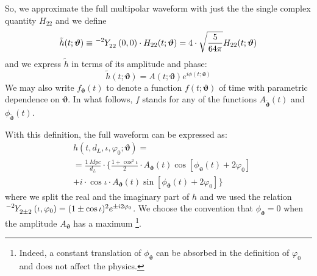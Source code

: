 So, we approximate the full multipolar waveform with just the  the single complex quantity $H_{22}$ and we define
\begin{equation}\label{eq:h_std}
	\tilde{h}(t; \boldsymbol{\vartheta}) \equiv \tensor[^{-2}]{Y}{_{2 2}}(0,0) \cdot H_{22}(t; \boldsymbol{\vartheta}) = 4\cdot\sqrt{\frac{5}{64\pi}}H_{22}(t; \boldsymbol{\vartheta})
\end{equation}
and we express $\tilde{h}$ in terms of its amplitude and phase:
\begin{equation}\label{eq:h_ML}
	\tilde{h}(t; \boldsymbol{\vartheta}) = A(t; \boldsymbol{\vartheta}) e^{i \phi(t; \boldsymbol{\vartheta})} 
\end{equation}
We may also write $f_{\boldsymbol{\vartheta}}(t)$ to denote a function $f(t;\boldsymbol{\vartheta})$ of time with parametric dependence on $\boldsymbol{\vartheta}$.
In what follows, $f$ stands for any of the functions $A_{\tilde{\boldsymbol{\vartheta}}}(t)$ and ${\phi}_{\tilde{\boldsymbol{\vartheta}}}(t)$.
\par
With this definition, the full waveform can be expressed as:
\begin{align} 
	&h(t, d_L,\iota,\varphi_0; \boldsymbol{\vartheta}) =  \nonumber\\
		&= {\frac{\SI{1}{Mpc}}{d_L}} \cdot \Bigg\{ \frac{1+\cos^2\iota}{2} \cdot A_{\boldsymbol{\vartheta}}(t)  \cos[\phi_{\boldsymbol{\vartheta}}(t)+2\varphi_0]  \nonumber \\
		&+ i \cdot \cos\iota \cdot A_{\boldsymbol{\vartheta}}(t) \sin[\phi_{\boldsymbol{\vartheta}}(t)+2\varphi_0] \Bigg\}
\label{eq:h_parametrization_simple}
\end{align}
where we split the real and the imaginary part of $h$ and we used the relation ${\tensor[^{-2}]{Y}{_{2 \pm 2}}(\iota, \varphi_0) = (1 \pm \cos \iota)^2 e^{\pm i 2 \varphi_0}}$.
We choose the convention that $\phi_{\boldsymbol{\vartheta}} = 0$ when the amplitude $A_{\boldsymbol{\vartheta}}$ has a maximum
\footnote{Indeed, a constant translation of $\phi_{\boldsymbol{\vartheta}}$ can be absorbed in the definition of $\varphi_0$ and does not affect the physics.}.
\par

